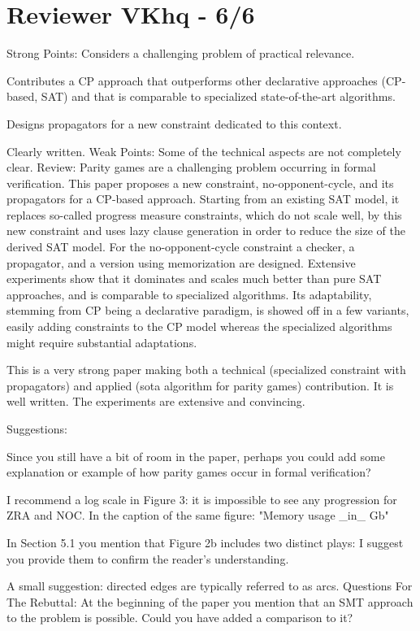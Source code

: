 \documentclass{article}
\begin{document}
\section{Reviewer VKhq - 6/6}\label{rev:VKhq}

\begin{reviewer}
Strong Points: Considers a challenging problem of practical relevance.

Contributes a CP approach that outperforms other declarative approaches (CP-based, SAT) and that is comparable to specialized state-of-the-art algorithms.

Designs propagators for a new constraint dedicated to this context.

Clearly written.
Weak Points: Some of the technical aspects are not completely clear.
Review: Parity games are a challenging problem occurring in formal verification. This paper proposes a new constraint, no-opponent-cycle, and its propagators for a CP-based approach. Starting from an existing SAT model, it replaces so-called progress measure constraints, which do not scale well, by this new constraint and uses lazy clause generation in order to reduce the size of the derived SAT model. For the no-opponent-cycle constraint a checker, a propagator, and a version using memorization are designed. Extensive experiments show that it dominates and scales much better than pure SAT approaches, and is comparable to specialized algorithms. Its adaptability, stemming from CP being a declarative paradigm, is showed off in a few variants, easily adding constraints to the CP model whereas the specialized algorithms might require substantial adaptations.

This is a very strong paper making both a technical (specialized constraint with propagators) and applied (sota algorithm for parity games) contribution. It is well written. The experiments are extensive and convincing.

Suggestions:

Since you still have a bit of room in the paper, perhaps you could add some explanation or example of how parity games occur in formal verification?

I recommend a log scale in Figure 3: it is impossible to see any progression for ZRA and NOC. In the caption of the same figure: "Memory usage _in_ Gb"

In Section 5.1 you mention that Figure 2b includes two distinct plays: I suggest you provide them to confirm the reader's understanding.

A small suggestion: directed edges are typically referred to as arcs.
Questions For The Rebuttal: At the beginning of the paper you mention that an SMT approach to the problem is possible. Could you have added a comparison to it?


\end{reviewer}
\end{document}
